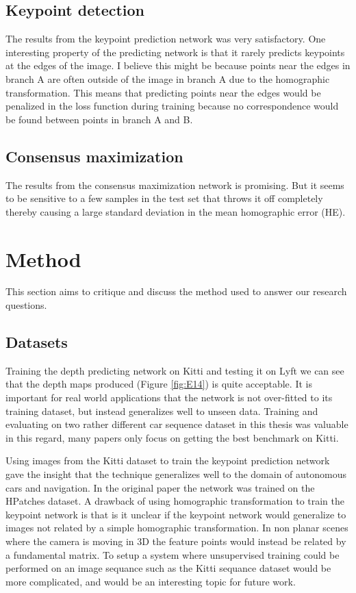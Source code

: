 \subsection{Keypoint detection}

The results from the keypoint prediction network was very satisfactory. One interesting property of the predicting network is that it rarely predicts keypoints at the edges of the image. I believe this might be because points near the edges in branch A are often outside of the image in branch A due to the homographic transformation. This means that predicting points near the edges would be penalized in the loss function during training because no correspondence would be found between points in branch A and B.

\subsection{Consensus maximization}

The results from the consensus maximization network is promising. But it seems to be sensitive to a few samples in the test set that throws it off completely thereby causing a large standard deviation in the mean homographic error (HE).

\section{Method}

This section aims to critique and discuss the method used to answer our research questions.

\subsection{Datasets}

Training the depth predicting network on Kitti and testing it on Lyft we can see that the depth maps produced (Figure \ref{fig:E14}) is quite acceptable. It is important for real world applications that the network is not over-fitted to its training dataset, but instead generalizes well to unseen data. Training and evaluating on two rather different car sequence dataset in this thesis was valuable in this regard, many papers only focus on getting the best benchmark on Kitti.

Using images from the Kitti dataset to train the keypoint prediction network gave the insight that the technique generalizes well to the domain of autonomous cars and navigation. In the original paper the network was trained on the HPatches\cite{hpatches} dataset. A drawback of using homographic transformation to train the keypoint network is that is it unclear if the keypoint network would generalize to images not related by a simple homographic transformation. In non planar scenes where the camera is moving in 3D the feature points would instead be related by a fundamental matrix. To setup a system where unsupervised training could be performed on an image sequance such as the Kitti sequance dataset would be more complicated, and would be an interesting topic for future work.

